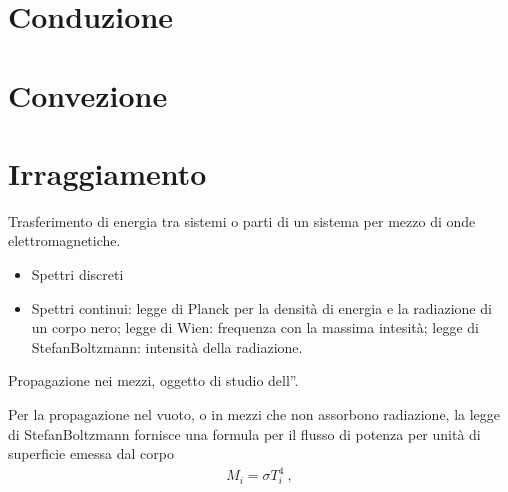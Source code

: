 \documentclass[letterpaper,10pt,italian]{jupyterBook}
\begin{document}
\section{Conduzione}
\label{\detokenize{ch/thermodynamics/heat-transmission:conduzione}}\label{\detokenize{ch/thermodynamics/heat-transmission:physics-hs-thermodynamics-heat-transmission-conduction}}

\section{Convezione}
\label{\detokenize{ch/thermodynamics/heat-transmission:convezione}}\label{\detokenize{ch/thermodynamics/heat-transmission:physics-hs-thermodynamics-heat-transmission-convection}}

\section{Irraggiamento}
\label{\detokenize{ch/thermodynamics/heat-transmission:irraggiamento}}\label{\detokenize{ch/thermodynamics/heat-transmission:physics-hs-thermodynamics-heat-transmission-radiation}}
\sphinxAtStartPar
Trasferimento di energia tra sistemi o parti di un sistema per mezzo di onde elettromagnetiche.

\sphinxAtStartPar
{}
\begin{itemize}
\item {} 
\sphinxAtStartPar
Spettri discreti

\item {} 
\sphinxAtStartPar
Spettri continui: legge di Planck per la densità di energia e la radiazione di un corpo nero; legge di Wien: frequenza con la massima intesità; legge di Stefan\sphinxhyphen{}Boltzmann: intensità della radiazione.

\end{itemize}

\sphinxAtStartPar
{}
Propagazione nei mezzi, oggetto di studio dell”.

\sphinxAtStartPar
Per la propagazione nel vuoto, o in mezzi che non assorbono radiazione, la legge di Stefan\sphinxhyphen{}Boltzmann fornisce una formula per il flusso di potenza per unità di superficie emessa dal corpo
\begin{equation*}
\begin{split}M_i = \sigma T_i^4 \ ,\end{split}
\end{equation*}
\sphinxstepscope
\end{document}
